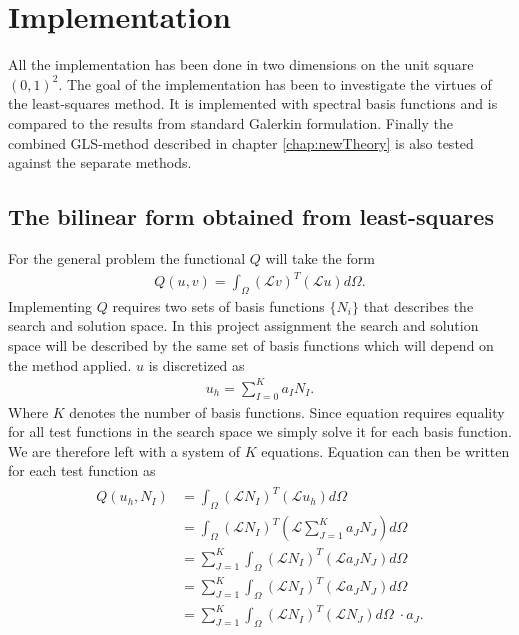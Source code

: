 
\chapter{Implementation} %

\label{chap:Implementation} %



All the implementation has been done in two dimensions on the unit square $(0,1)^2$. The goal of the implementation has been to investigate the virtues of the least-squares method. It is implemented with spectral basis functions and is compared to the results from standard Galerkin formulation. Finally the combined GLS-method described in chapter \ref{chap:newTheory} is also tested against the separate methods. \section{The bilinear form obtained from least-squares}
 For the general problem the functional $Q$ will take the form 
\begin{align}
	Q(u,v)=\int_{\Omega}(\mathcal{L}v)^T(\mathcal{L}u)d\Omega.
	\label{eq:functionalInt}
\end{align}
Implementing $Q$ requires two sets of basis functions $\{N_i\}$ that describes the search and solution space. In this project assignment the search and solution space will be described by the same set of basis functions which will depend on the method applied. $u$ is discretized as 
\begin{align}
	u_h = \sum_{I=0}^{K}a_IN_I.
	\label{eq:uDisc}
\end{align}
Where $K$ denotes the number of basis functions. Since equation requires equality for all test functions in the search space we simply solve it for each basis function. We are therefore left with a system of $K$ equations. Equation can then be written for each test function as  
\begin{align}
	\begin{split}
	Q(u_h,N_I) &= \int_{\Omega}(\mathcal{L}N_I)^T(\mathcal{L}u_h)d\Omega \\
	&= \int_{\Omega}(\mathcal{L}N_I)^T(\mathcal{L}\sum_{J=1}^Ka_JN_J)d\Omega \\
	&= \sum_{J=1}^K\int_{\Omega}(\mathcal{L}N_I)^T(\mathcal{L}a_JN_J)d\Omega \\
	&= \sum_{J=1}^K\int_{\Omega}(\mathcal{L}N_I)^T(\mathcal{L}a_JN_J)d\Omega \\
	&= \sum_{J=1}^K\int_{\Omega}(\mathcal{L}N_I)^T(\mathcal{L}N_J)d\Omega \;\cdot a_J.
	\end{split}
	\label{eq:varFormDisc}
\end{align}
